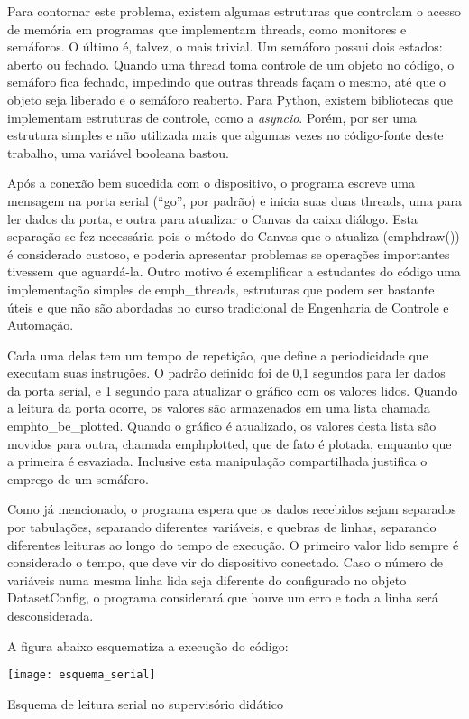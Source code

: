 Para contornar este problema, existem algumas estruturas que controlam o acesso de memória em programas que implementam threads, como monitores e semáforos. O último é, talvez, o mais trivial. Um semáforo possui dois estados: aberto ou fechado. Quando uma thread toma controle de um objeto no código, o semáforo fica fechado, impedindo que outras threads façam o mesmo, até que o objeto seja liberado e o semáforo reaberto. Para Python, existem bibliotecas que implementam estruturas de controle, como a \emph{asyncio}. Porém, por ser uma estrutura simples e não utilizada mais que algumas vezes no código-fonte deste trabalho, uma variável booleana bastou.

Após a conexão bem sucedida com o dispositivo, o programa escreve uma mensagem na porta serial (“go”, por padrão) e inicia suas duas threads, uma para ler dados da porta, e outra para atualizar o Canvas da caixa diálogo. Esta separação se fez necessária pois o método do Canvas que o atualiza (emph{draw()}) é considerado custoso, e poderia apresentar problemas se operações importantes tivessem que aguardá-la. Outro motivo é exemplificar a estudantes do código uma implementação simples de emph{\_threads}, estruturas que podem ser bastante úteis e que não são abordadas no curso tradicional de Engenharia de Controle e Automação.

Cada uma delas tem um tempo de repetição, que define a periodicidade que executam suas instruções. O padrão definido foi de 0,1 segundos para ler dados da porta serial, e 1 segundo para atualizar o gráfico com os valores lidos. Quando a leitura da porta ocorre, os valores são armazenados em uma lista chamada emph{to\_be\_plotted}. Quando o gráfico é atualizado, os valores desta lista são movidos para outra, chamada emph{plotted}, que de fato é plotada, enquanto que a primeira é esvaziada. Inclusive esta manipulação compartilhada justifica o emprego de um semáforo.

Como já mencionado, o programa espera que os dados recebidos sejam separados por tabulações, separando diferentes variáveis, e quebras de linhas, separando diferentes leituras ao longo do tempo de execução. O primeiro valor lido sempre é considerado o tempo, que deve vir do dispositivo conectado. Caso o número de variáveis numa mesma linha lida seja diferente do configurado no objeto DatasetConfig, o programa considerará que houve um erro e toda a linha será desconsiderada.

A figura abaixo esquematiza a execução do código:

\begin{quadro}
	\centering
	\texttt{[image: esquema\_serial]}
	\caption{Esquema de leitura serial no supervisório didático}
	\label{img_esquema_serial}
\end{quadro}

